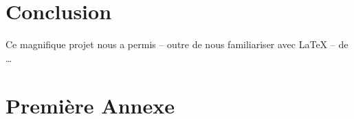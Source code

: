 \documentclass[a4paper, 12pt]{article}
\begin{document}
\clearpage 

\section*{Conclusion}

Ce magnifique projet nous a permis -- outre de nous familiariser avec \LaTeX{} -- de \ldots

\clearpage 




\clearpage 
\appendix
\bigskip{}
\section{Première Annexe}
\end{document}
